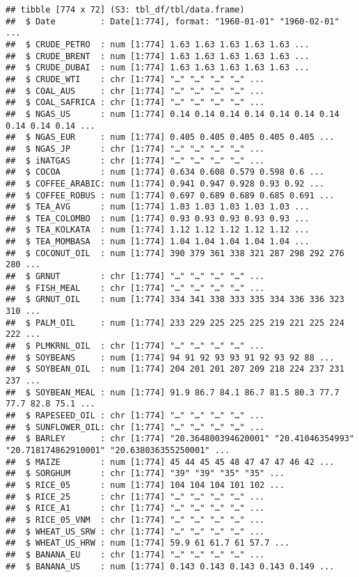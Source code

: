 \documentclass[
]{article}
\begin{document}
\begin{verbatim}
## tibble [774 x 72] (S3: tbl_df/tbl/data.frame)
##  $ Date         : Date[1:774], format: "1960-01-01" "1960-02-01" ...
##  $ CRUDE_PETRO  : num [1:774] 1.63 1.63 1.63 1.63 1.63 ...
##  $ CRUDE_BRENT  : num [1:774] 1.63 1.63 1.63 1.63 1.63 ...
##  $ CRUDE_DUBAI  : num [1:774] 1.63 1.63 1.63 1.63 1.63 ...
##  $ CRUDE_WTI    : chr [1:774] "…" "…" "…" "…" ...
##  $ COAL_AUS     : chr [1:774] "…" "…" "…" "…" ...
##  $ COAL_SAFRICA : chr [1:774] "…" "…" "…" "…" ...
##  $ NGAS_US      : num [1:774] 0.14 0.14 0.14 0.14 0.14 0.14 0.14 0.14 0.14 0.14 ...
##  $ NGAS_EUR     : num [1:774] 0.405 0.405 0.405 0.405 0.405 ...
##  $ NGAS_JP      : chr [1:774] "…" "…" "…" "…" ...
##  $ iNATGAS      : chr [1:774] "…" "…" "…" "…" ...
##  $ COCOA        : num [1:774] 0.634 0.608 0.579 0.598 0.6 ...
##  $ COFFEE_ARABIC: num [1:774] 0.941 0.947 0.928 0.93 0.92 ...
##  $ COFFEE_ROBUS : num [1:774] 0.697 0.689 0.689 0.685 0.691 ...
##  $ TEA_AVG      : num [1:774] 1.03 1.03 1.03 1.03 1.03 ...
##  $ TEA_COLOMBO  : num [1:774] 0.93 0.93 0.93 0.93 0.93 ...
##  $ TEA_KOLKATA  : num [1:774] 1.12 1.12 1.12 1.12 1.12 ...
##  $ TEA_MOMBASA  : num [1:774] 1.04 1.04 1.04 1.04 1.04 ...
##  $ COCONUT_OIL  : num [1:774] 390 379 361 338 321 287 298 292 276 280 ...
##  $ GRNUT        : chr [1:774] "…" "…" "…" "…" ...
##  $ FISH_MEAL    : chr [1:774] "…" "…" "…" "…" ...
##  $ GRNUT_OIL    : num [1:774] 334 341 338 333 335 334 336 336 323 310 ...
##  $ PALM_OIL     : num [1:774] 233 229 225 225 225 219 221 225 224 222 ...
##  $ PLMKRNL_OIL  : chr [1:774] "…" "…" "…" "…" ...
##  $ SOYBEANS     : num [1:774] 94 91 92 93 93 91 92 93 92 88 ...
##  $ SOYBEAN_OIL  : num [1:774] 204 201 201 207 209 218 224 237 231 237 ...
##  $ SOYBEAN_MEAL : num [1:774] 91.9 86.7 84.1 86.7 81.5 80.3 77.7 77.7 82.8 75.1 ...
##  $ RAPESEED_OIL : chr [1:774] "…" "…" "…" "…" ...
##  $ SUNFLOWER_OIL: chr [1:774] "…" "…" "…" "…" ...
##  $ BARLEY       : chr [1:774] "20.364800394620001" "20.41046354993" "20.718174862910001" "20.638036355250001" ...
##  $ MAIZE        : num [1:774] 45 44 45 45 48 47 47 47 46 42 ...
##  $ SORGHUM      : chr [1:774] "39" "39" "35" "35" ...
##  $ RICE_05      : num [1:774] 104 104 104 101 102 ...
##  $ RICE_25      : chr [1:774] "…" "…" "…" "…" ...
##  $ RICE_A1      : chr [1:774] "…" "…" "…" "…" ...
##  $ RICE_05_VNM  : chr [1:774] "…" "…" "…" "…" ...
##  $ WHEAT_US_SRW : chr [1:774] "…" "…" "…" "…" ...
##  $ WHEAT_US_HRW : num [1:774] 59.9 61 61.7 61 57.7 ...
##  $ BANANA_EU    : chr [1:774] "…" "…" "…" "…" ...
##  $ BANANA_US    : num [1:774] 0.143 0.143 0.143 0.143 0.149 ...

\end{verbatim}
\end{document}
